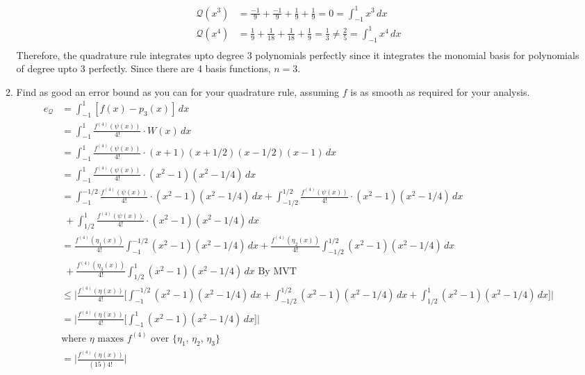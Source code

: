 \documentclass{article}
\begin{document}
\begin{enumerate}
\begin{enumerate}
\begin{align*}
                \mathcal{Q}(x^3) &= \frac{-1}{9} + \frac{-1}{9} + \frac{1}{9} + \frac{1}{9} = 0 = \int_{-1}^1 x^3 \, dx\\
                \mathcal{Q}(x^4) &= \frac{1}{9} + \frac{1}{18} + \frac{1}{18} + \frac{1}{9} = \frac{1}{3} \not = \frac{2}{5} = \int_{-1}^1 x^4 \, dx \\
            \end{align*} 
            Therefore, the quadrature rule integrates upto degree 3 polynomials perfectly since it integrates the monomial basis for polynomials of degree upto 3 perfectly. Since there are 4 basis functions, $n = 3$.
            \item Find as good an error bound as you can for your quadrature rule, assuming $f$ is as smooth as required for your analysis.
            \begin{align*}
                e_{\mathcal{Q}} &= \int_{-1}^1 [f(x) - p_3(x)] \, dx \\
                &= \int_{-1}^1 \frac{f^{(4)}(\psi(x))}{4!} \cdot W(x) \, dx \\
                &= \int_{-1}^1 \frac{f^{(4)}(\psi(x))}{4!} \cdot (x + 1)(x + 1/2)(x - 1/2)(x - 1) \, dx \\
                &= \int_{-1}^1 \frac{f^{(4)}(\psi(x))}{4!} \cdot (x^2 - 1)(x^2 - 1/4) \, dx \\
                &= \int_{-1}^{-1/2} \frac{f^{(4)}(\psi(x))}{4!} \cdot (x^2 - 1)(x^2 - 1/4) \, dx + \int_{-1/2}^{1/2} \frac{f^{(4)}(\psi(x))}{4!} \cdot (x^2 - 1)(x^2 - 1/4) \, dx \\
                &\; + \int_{1/2}^{1} \frac{f^{(4)}(\psi(x))}{4!} \cdot (x^2 - 1)(x^2 - 1/4) \, dx \\
                &= \frac{f^{(4)}(\eta_1(x))}{4!} \int_{-1}^{-1/2} (x^2 - 1)(x^2 - 1/4) \, dx +\frac{f^{(4)}(\eta_2(x))}{4!} \int_{-1/2}^{1/2}  (x^2 - 1)(x^2 - 1/4) \, dx \\
                &\; +\frac{f^{(4)}(\eta_3(x))}{4!}  \int_{1/2}^{1} (x^2 - 1)(x^2 - 1/4) \, dx \text{ By MVT}\\
                &\leq \Big| \frac{f^{(4)}(\eta(x))}{4!} \Big[ \int_{-1}^{-1/2} (x^2 - 1)(x^2 - 1/4) \, dx +\int_{-1/2}^{1/2}  (x^2 - 1)(x^2 - 1/4) \, dx +\int_{1/2}^{1} (x^2 - 1)(x^2 - 1/4) \, dx \Big] \Big| \\
                &= \Big| \frac{f^{(4)}(\eta(x))}{4!} \Big[ \int_{-1}^{1} (x^2 - 1)(x^2 - 1/4) \, dx \Big] \Big| \\
                &\text{where $\eta$ maxes $f^{(4)}$ over $\{ \eta_1,\, \eta_2,\, \eta_3 \}$}\\
                &= \Big| \frac{f^{(4)}(\eta(x))}{(15)4!}\Big| \\
            \end{align*} 
        \end{enumerate}
\end{enumerate}
\end{document}

